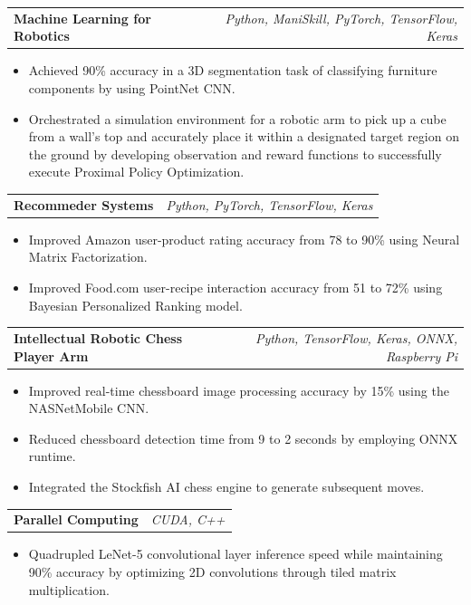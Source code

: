 \documentclass[letterpaper,11pt]{article}
\makeatletter
\newcommand{\resumeItem}[1]{
  \item\small{
    {#1 \vspace{-2pt}}
  }
}
\newcommand{\resumeProjectHeading}[2]{
    \vspace{-2pt}\item
    \begin{tabular*}{0.97\textwidth}{l@{\extracolsep{\fill}}r}
      \textcolor{secondary_color}{\textbf{#1}} & \textcolor{secondary_color}{\textit{\small #2}} \\
    \end{tabular*}\vspace{-7pt}
}
\newcommand{\resumeItemListStart}{\begin{itemize}}
\newcommand{\resumeItemListEnd}{\end{itemize}\vspace{-5pt}}
\makeatother
\begin{document}
    \resumeProjectHeading
    {\textbf{Machine Learning for Robotics}}{Python, ManiSkill, PyTorch, TensorFlow, Keras}
      \resumeItemListStart
            \resumeItem{Achieved 90\% accuracy in a 3D segmentation task of classifying furniture components by using PointNet CNN.}
            \resumeItem{Orchestrated a simulation environment for a robotic arm to pick up a cube from a wall’s top and accurately place it within a designated target region on the ground by developing observation and reward functions to successfully execute Proximal Policy Optimization.}
      \resumeItemListEnd
  
      \resumeProjectHeading
      {\textbf{Recommeder Systems}}{Python, PyTorch, TensorFlow, Keras}
        \resumeItemListStart
              \resumeItem{Improved Amazon user-product rating accuracy from 78 to 90\% using Neural Matrix Factorization.}
              \resumeItem{Improved Food.com user-recipe interaction accuracy from 51 to 72\% using Bayesian Personalized Ranking model.}
        \resumeItemListEnd

      \resumeProjectHeading
        {\textbf{Intellectual Robotic Chess Player Arm}}{Python, TensorFlow, Keras, ONNX, Raspberry Pi}
          \resumeItemListStart
            \resumeItem{Improved real-time chessboard image processing accuracy by 15\% using the NASNetMobile CNN.}
            \resumeItem{Reduced chessboard detection time from 9 to 2 seconds by employing ONNX runtime.}
            \resumeItem{Integrated the Stockfish AI chess engine to generate subsequent moves.}
          \resumeItemListEnd

      \resumeProjectHeading
        {\textbf{Parallel Computing}}{CUDA, C++}
          \resumeItemListStart
            \resumeItem{Quadrupled LeNet-5 convolutional layer inference speed while maintaining 90\% accuracy by optimizing 2D convolutions through tiled matrix multiplication.}
          \resumeItemListEnd
          
\end{document}
